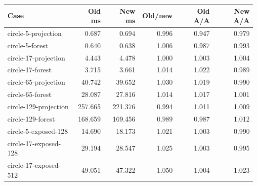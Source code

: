 \begin{center}\small
\begin{tabular}{lrrrrr}
\toprule
Case & Old ms & New ms & Old/new & Old A/A & New A/A \\
\midrule
circle-5-projection & 0.687 & 0.694 & 0.996 & 0.947 & 0.979 \\
circle-5-forest & 0.640 & 0.638 & 1.006 & 0.987 & 0.993 \\
circle-17-projection & 4.443 & 4.478 & 1.000 & 1.003 & 1.004 \\
circle-17-forest & 3.715 & 3.661 & 1.014 & 1.022 & 0.989 \\
circle-65-projection & 40.742 & 39.652 & 1.030 & 1.019 & 0.990 \\
circle-65-forest & 28.087 & 27.816 & 1.014 & 1.017 & 1.001 \\
circle-129-projection & 257.665 & 221.376 & 0.994 & 1.011 & 1.009 \\
circle-129-forest & 168.659 & 169.456 & 0.989 & 0.987 & 1.012 \\
circle-5-exposed-128 & 14.690 & 18.173 & 1.021 & 1.003 & 0.990 \\
circle-17-exposed-128 & 29.194 & 28.547 & 1.025 & 1.003 & 0.995 \\
circle-17-exposed-512 & 49.051 & 47.322 & 1.050 & 1.004 & 1.023 \\
\bottomrule
\end{tabular}
\end{center}
